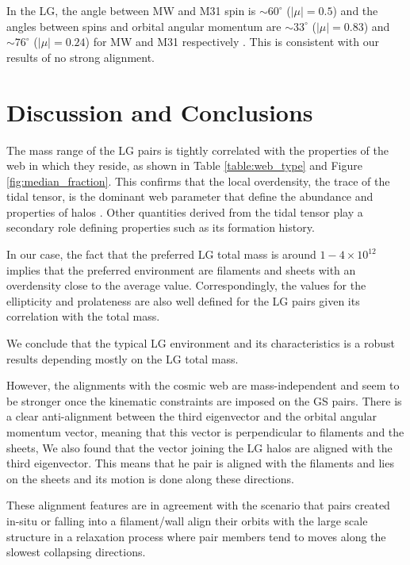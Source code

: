 \documentclass{emulateapj}
\newcommand{\Msun}{{\ifmmode{{\rm {M_{\odot}}}}\else{${\rm{M_{\odot}}}$}\fi}}
\begin{document}
In the LG, the angle between MW and M31 spin is $\sim60^{\circ}$
($|\mu|=0.5$) and the angles between spins and orbital angular
momentum are $\sim33^{\circ}$ ($|\mu|=0.83$) and $\sim76^{\circ}$
($|\mu|=0.24$) for MW and M31 respectively
\citep{2012ApJ...753....9V}. 
This is consistent with our results of no strong alignment.

\section{Discussion and Conclusions}
\label{sec:discussion}

The mass range of the LG pairs is tightly correlated with the
properties of the web in which they reside, as shown in Table
\ref{table:web_type} and Figure \ref{fig:median_fraction}. This
confirms that the local overdensity, the trace of the tidal tensor,
is the dominant web parameter that define the abundance and properties
of halos 
\citep{1998ApJ...500...14L,1999MNRAS.302..111L,2004MNRAS.350.1385S,2009MNRAS.394.1825F,
  Alonso2014}. Other
quantities derived from the tidal tensor play a secondary role
defining properties such as its formation history. 

In our case, the fact that the preferred LG total mass is around
$1-4\times 10^{12}$\Msun $\,$implies that the preferred environment are
filaments and sheets with an overdensity close to the average
value. 
Correspondingly, the values for the ellipticity and prolateness are
also well defined for the LG pairs given its correlation with the
total mass.

We conclude that the typical LG environment and its characteristics is
a robust results depending mostly on the LG total mass.

However, the alignments with the cosmic web are 
mass-independent and seem to be stronger once the kinematic constraints
are imposed on the GS pairs. There is a clear anti-alignment between
the third eigenvector and the orbital angular momentum vector, meaning
that this vector is perpendicular to filaments and the sheets,  We
also found that the vector joining the LG halos are aligned with the
third eigenvector. This means that he pair is aligned with the filaments and
lies on the sheets and its motion is done along these directions. 

These alignment features are in agreement with the scenario that pairs 
created in-situ or falling into a filament/wall align their orbits with 
the large scale structure in a relaxation process where pair members
tend to moves along the slowest collapsing directions.
\end{document}
